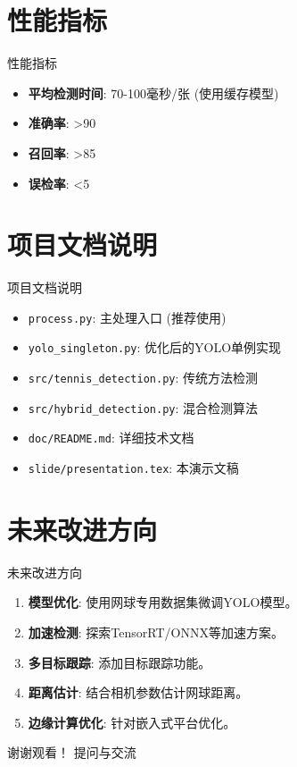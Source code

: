 \documentclass{beamer}
\begin{document}
\section{性能指标}
\begin{frame}{性能指标}
    \begin{itemize}
        \item \textbf{平均检测时间}: 70-100毫秒/张 (使用缓存模型)
        \item \textbf{准确率}: >90%
        \item \textbf{召回率}: >85%
        \item \textbf{误检率}: <5%
    \end{itemize}
\end{frame}

\section{项目文档说明}
\begin{frame}{项目文档说明}
    \begin{itemize}
        \item \texttt{process.py}: 主处理入口 (推荐使用)
        \item \texttt{yolo\_singleton.py}: 优化后的YOLO单例实现
        \item \texttt{src/tennis\_detection.py}: 传统方法检测
        \item \texttt{src/hybrid\_detection.py}: 混合检测算法
        \item \texttt{doc/README.md}: 详细技术文档
        \item \texttt{slide/presentation.tex}: 本演示文稿
    \end{itemize}
\end{frame}

\section{未来改进方向}
\begin{frame}{未来改进方向}
    \begin{enumerate}
        \item \textbf{模型优化}: 使用网球专用数据集微调YOLO模型。
        \item \textbf{加速检测}: 探索TensorRT/ONNX等加速方案。
        \item \textbf{多目标跟踪}: 添加目标跟踪功能。
        \item \textbf{距离估计}: 结合相机参数估计网球距离。
        \item \textbf{边缘计算优化}: 针对嵌入式平台优化。
    \end{enumerate}
\end{frame}

\begin{frame}
    \centering
    {\Huge 谢谢观看！}
    \vfill
    提问与交流
\end{frame}
\end{document}
